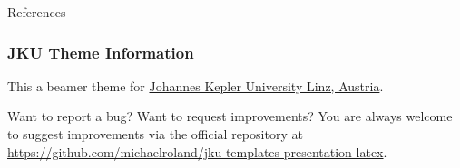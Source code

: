 \documentclass[utf8,aspectratio=169,ngerman,english]{beamer}
\begin{document}
\begin{frame}[allowframebreaks]{References}
\printbibliography
\end{frame}


\begin{frame}
\frametitle{JKU Theme Information}

This a beamer theme for \href{https://www.jku.at/}{Johannes Kepler University Linz, Austria}.

\bigskip
\begin{exampleblock}{Want to report a bug? Want to request improvements?}
You are always welcome to suggest improvements via the official repository at \url{https://github.com/michaelroland/jku-templates-presentation-latex}.
\end{exampleblock}
\end{frame}


\jkulogo

\fi
\end{document}
